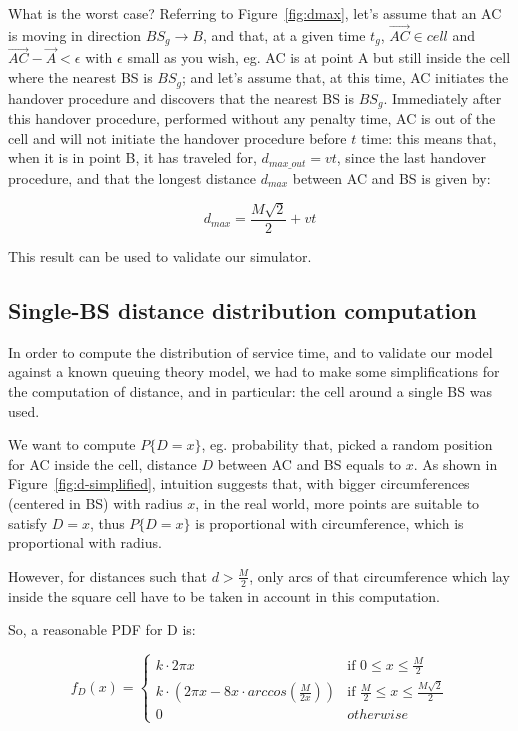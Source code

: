 \documentclass[a4paper,12pt]{article}
\begin{document}
What is the worst case? Referring to Figure~\ref{fig:dmax}, let's assume that an AC is moving in direction $BS_g \rightarrow B$, and that, at a given time $t_g$, $\overrightarrow{AC} \in cell$ and $\overrightarrow{AC} - \overrightarrow{A} < \epsilon$ with $\epsilon$ small as you wish, eg. AC is at point A but still inside the cell where the nearest BS is $BS_g$; and let's assume that, at this time, AC initiates the handover procedure and discovers that the nearest BS is $BS_g$. Immediately after this handover procedure, performed without any penalty time, AC is out of the cell and will not initiate the handover procedure before $t$ time: this means that, when it is in point B, it has traveled for, $d_{max\_out} = v t$, since the last handover procedure, and that the longest distance $d_{max}$ between AC and BS is given by:

$$ d_{max} = \frac{M \sqrt{2}}{2} + vt $$

This result can be used to validate our simulator.

\subsection{Single-BS distance distribution computation}
\label{sec:singlebs-ddc}
In order to compute the distribution of service time, and to validate our model against a known queuing theory model, we had to make some simplifications for the computation of distance, and in particular: the cell around a single BS was used.

We want to compute $P\{D = x\}$, eg. probability that, picked a random position for AC inside the cell, distance $D$ between AC and BS equals to $x$.
As shown in Figure~\ref{fig:d-simplified}, intuition suggests that, with bigger circumferences (centered in BS) with radius $x$, in the real world, more points are suitable to satisfy $D = x$, thus $P\{D = x\}$ is proportional with circumference, which is proportional with radius.

However, for distances such that $d > \frac{M}{2}$, only arcs of that circumference which lay inside the square cell have to be taken in account in this computation.

So, a reasonable PDF for D is:

$$
f_D(x) = \begin{cases}
k \cdot 2 \pi x & \mbox{if } 0 \leq x \leq \frac{M}{2} \\
k \cdot \left( 2 \pi x - 8 x \cdot arccos \left(\frac{M}{2x}\right)\right) & \mbox{if } \frac{M}{2} \leq x \leq \frac{M \sqrt{2}}{2}\\
0 & otherwise
\end{cases}
$$
\end{document}

